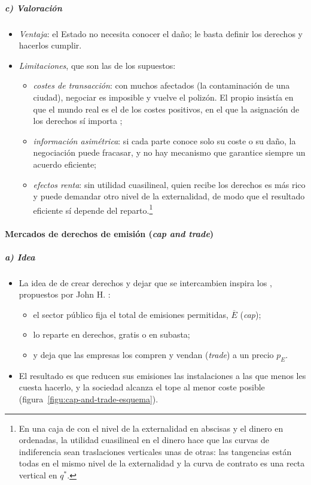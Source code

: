 \documentclass[11pt]{article}
\begin{document}
\subparagraph{c) Valoración}
\begin{itemize}
\item \emph{Ventaja}: el Estado no necesita conocer el daño; le basta definir los derechos y hacerlos cumplir.
\item \emph{Limitaciones}, que son las de los supuestos:
  \begin{itemize}
  \item \emph{costes de transacción}: con muchos afectados (la contaminación de una ciudad), negociar es imposible y vuelve el polizón. El propio  insistía en que el mundo real es el de los costes positivos, en el que la asignación de los derechos sí importa ;
  \item \emph{información asimétrica}: si cada parte conoce solo su coste o su daño, la negociación puede fracasar, y no hay mecanismo que garantice siempre un acuerdo eficiente\nocite{MyersonSatterthwaite1983Efficient};
  \item \emph{efectos renta}: sin utilidad cuasilineal, quien recibe los derechos es más rico y puede demandar otro nivel de la externalidad, de modo que el resultado eficiente sí depende del reparto.\footnote{En una caja de  con el nivel de la externalidad en abscisas y el dinero en ordenadas, la utilidad cuasilineal en el dinero hace que las curvas de indiferencia sean traslaciones verticales unas de otras: las tangencias están todas en el mismo nivel de la externalidad y la curva de contrato es una recta vertical en $q^*$\nocite{MasColellWhinstonGreen1995}.}
  \end{itemize}
\end{itemize}

\paragraph{Mercados de derechos de emisión (\emph{cap and trade})}

\subparagraph{a) Idea}
\begin{itemize}
\item La idea de  de crear derechos y dejar que se intercambien inspira los , propuestos por John H. \textcite{Dales1968Pollution}:
  \begin{itemize}
  \item el sector público fija el total de emisiones permitidas, $\overline{E}$ (\emph{cap});
  \item lo reparte en derechos, gratis o en subasta;
  \item y deja que las empresas los compren y vendan (\emph{trade}) a un precio $p_E$.
  \end{itemize}
\item El resultado es que reducen sus emisiones las instalaciones a las que menos les cuesta hacerlo, y la sociedad alcanza el tope al menor coste posible (figura~\ref{figu:cap-and-trade-esquema}).
\end{itemize}
\end{document}
